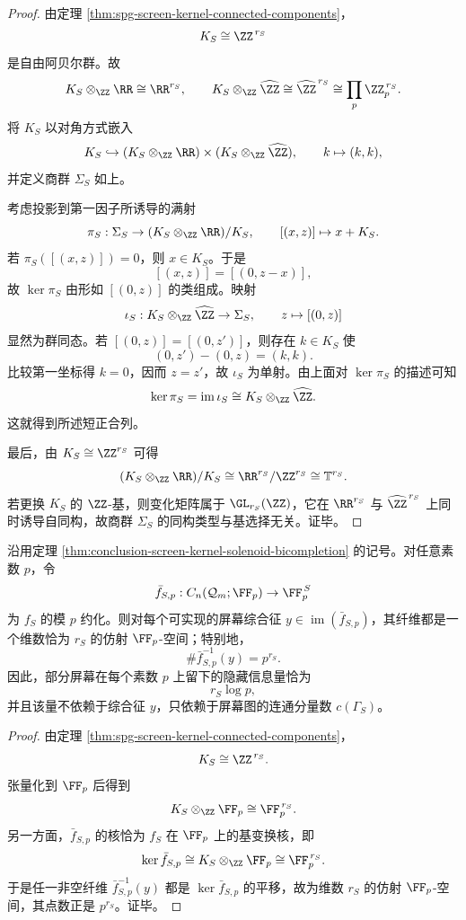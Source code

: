 \begin{proof}
由定理 \ref{thm:spg-screen-kernel-connected-components}，
\[
K_S\cong \ZZ^{\,r_S}
\]
是自由阿贝尔群。故
\[
K_S\otimes_{\ZZ}\RR\cong \RR^{r_S},
\qquad
K_S\otimes_{\ZZ}\widehat{\ZZ}\cong \widehat{\ZZ}^{\,r_S}\cong \prod_p \ZZ_p^{\,r_S}.
\]
将 \(K_S\) 以对角方式嵌入
\[
K_S\hookrightarrow (K_S\otimes_{\ZZ}\RR)\times (K_S\otimes_{\ZZ}\widehat{\ZZ}),
\qquad
k\mapsto (k,k),
\]
并定义商群 \(\Sigma_S\) 如上。

考虑投影到第一因子所诱导的满射
\[
\pi_S:\Sigma_S\to (K_S\otimes_{\ZZ}\RR)/K_S,
\qquad
[(x,z)]\mapsto x+K_S.
\]
若 \(\pi_S([(x,z)])=0\)，则 \(x\in K_S\)。于是
\[
[(x,z)]=[(0,z-x)],
\]
故 \(\ker\pi_S\) 由形如 \([(0,z)]\) 的类组成。映射
\[
\iota_S:K_S\otimes_{\ZZ}\widehat{\ZZ}\to \Sigma_S,
\qquad
z\mapsto [(0,z)]
\]
显然为群同态。若 \([(0,z)]=[(0,z')]\)，则存在 \(k\in K_S\) 使
\[
(0,z')-(0,z)=(k,k).
\]
比较第一坐标得 \(k=0\)，因而 \(z=z'\)，故 \(\iota_S\) 为单射。由上面对 \(\ker\pi_S\) 的描述可知
\[
\ker\pi_S=\operatorname{im}\iota_S\cong K_S\otimes_{\ZZ}\widehat{\ZZ}.
\]
这就得到所述短正合列。

最后，由 \(K_S\cong \ZZ^{r_S}\) 可得
\[
(K_S\otimes_{\ZZ}\RR)/K_S\cong \RR^{r_S}/\ZZ^{r_S}\cong \mathbb T^{r_S}.
\]
若更换 \(K_S\) 的 \(\ZZ\)-基，则变化矩阵属于 \(\GL_{r_S}(\ZZ)\)，它在 \(\RR^{r_S}\) 与 \(\widehat{\ZZ}^{\,r_S}\) 上同时诱导自同构，故商群 \(\Sigma_S\) 的同构类型与基选择无关。证毕。
\end{proof}

\begin{corollary}\label{cor:conclusion-screen-padic-hidden-entropy-law}
沿用定理 \ref{thm:conclusion-screen-kernel-solenoid-bicompletion} 的记号。对任意素数 \(p\)，令
\[
\bar f_{S,p}:C_n(\mathcal Q_m;\FF_p)\to \FF_p^{\,S}
\]
为 \(f_S\) 的模 \(p\) 约化。则对每个可实现的屏幕综合征 \(y\in\operatorname{im}(\bar f_{S,p})\)，其纤维都是一个维数恰为 \(r_S\) 的仿射 \(\FF_p\)-空间；特别地，
\[
\#\bar f_{S,p}^{-1}(y)=p^{r_S}.
\]
因此，部分屏幕在每个素数 \(p\) 上留下的隐藏信息量恰为
\[
r_S\log p,
\]
并且该量不依赖于综合征 \(y\)，只依赖于屏幕图的连通分量数 \(c(\Gamma_S)\)。
\end{corollary}

\begin{proof}
由定理 \ref{thm:spg-screen-kernel-connected-components}，
\[
K_S\cong \ZZ^{\,r_S}.
\]
张量化到 \(\FF_p\) 后得到
\[
K_S\otimes_{\ZZ}\FF_p\cong \FF_p^{\,r_S}.
\]
另一方面，\(\bar f_{S,p}\) 的核恰为 \(f_S\) 在 \(\FF_p\) 上的基变换核，即
\[
\ker \bar f_{S,p}\cong K_S\otimes_{\ZZ}\FF_p\cong \FF_p^{\,r_S}.
\]
于是任一非空纤维 \(\bar f_{S,p}^{-1}(y)\) 都是 \(\ker\bar f_{S,p}\) 的平移，故为维数 \(r_S\) 的仿射 \(\FF_p\)-空间，其点数正是 \(p^{r_S}\)。证毕。
\end{proof}

